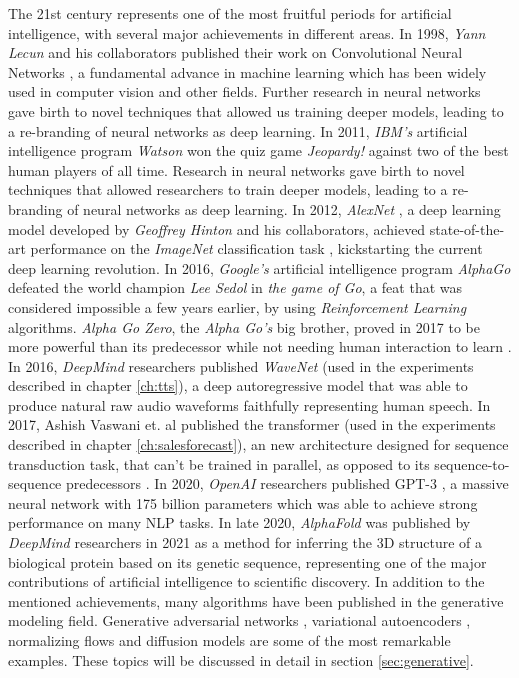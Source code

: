 The 21st century represents one of the most fruitful periods for artificial intelligence, with several major achievements in different areas. In 1998, \textit{Yann Lecun} and his collaborators published their work on Convolutional Neural Networks \cite{lecun1999}, a fundamental advance in machine learning which has been widely used in computer vision and other fields. Further research in neural networks \cite{hinton2006, hinton2012} gave birth to novel techniques that allowed us training deeper models, leading to a re-branding of neural networks as deep learning. In 2011, \textit{IBM's} artificial intelligence program \textit{Watson} won the quiz game \textit{Jeopardy!} against two of the best human players of all time. Research in neural networks gave birth to novel techniques that allowed researchers to train deeper models, leading to a re-branding of neural networks as deep learning. In 2012, \textit{AlexNet} \cite{krizhevsky2012}, a deep learning model developed by \textit{Geoffrey Hinton} and his collaborators, achieved state-of-the-art performance on the \textit{ImageNet} classification task \cite{ILSVRC15}, kickstarting the current deep learning revolution. In 2016, \textit{Google's} artificial intelligence program \textit{AlphaGo} \cite{silver2016} defeated the world champion \textit{Lee Sedol} in \textit{the game of Go}, a feat that was considered impossible a few years earlier, by using \textit{Reinforcement Learning} algorithms. \textit{Alpha Go Zero}, the \textit{Alpha Go's} big brother, proved in 2017 to be more powerful than its predecessor while not needing human interaction to learn \cite{Silver2017a, Silver2017b}. In 2016, \textit{DeepMind} researchers published \textit{WaveNet} \cite{vanderoord2016} (used in the experiments described in chapter \ref{ch:tts}), a deep autoregressive model that was able to produce natural raw audio waveforms faithfully representing human speech. In 2017, Ashish Vaswani et. al published the transformer \cite{vaswani2017} (used in the experiments described in chapter \ref{ch:salesforecast}), an new architecture designed for sequence transduction task, that can't be trained in parallel, as opposed to its sequence-to-sequence predecessors \cite{sutskever2014}. In 2020, \textit{OpenAI} researchers published GPT-3 \cite{brown2020}, a massive neural network with 175 billion parameters which was able to achieve strong performance on many NLP tasks. In late 2020, \textit{AlphaFold} was published by \textit{DeepMind} researchers in 2021 \cite{Jumper2021} as a method for inferring the 3D structure of a biological protein based on its genetic sequence, representing one of the major contributions of artificial intelligence to scientific discovery. In addition to the mentioned achievements, many algorithms have been published in the generative modeling field. Generative adversarial networks \cite{Goodfellow2014}, variational autoencoders \cite{kingma2019}, normalizing flows \cite{kingma2016, kobyzev} and diffusion models \cite{Prafulla2021} are some of the most remarkable examples. These topics will be discussed in detail in section \ref{sec:generative}.

